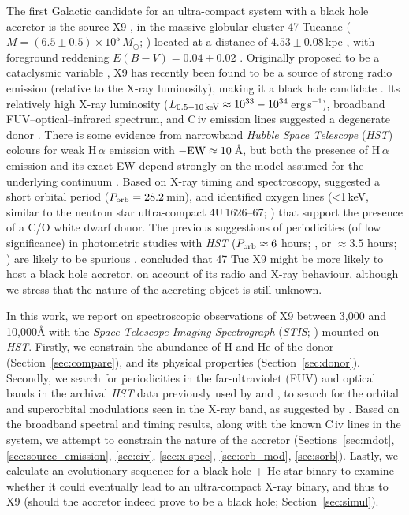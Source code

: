 \documentclass[a4paper,fleqn,usenatbib]{mnras}
\begin{document}
The first Galactic candidate for an ultra-compact system with a black hole accretor is the source X9 \citep{2015MNRAS.453.3918M}, in the massive globular cluster 47 Tucanae ($M = (6.5 \pm 0.5)\times 10^{5}\,M_\odot$; \citealp{2015AJ....149...53K}) located at a distance of $4.53 \pm 0.08$\,kpc \citep{2016ApJ...831..184B}, with foreground reddening $E(B-V) = 0.04 \pm 0.02$ \citep{2007A&A...476..243S}. Originally proposed to be a cataclysmic variable \citep{1992Natur.360...46P, 2001Sci...292.2290G}, X9 has recently been found to be a source of strong radio emission (relative to the X-ray luminosity), making it a black hole candidate \citep{2015MNRAS.453.3918M}. Its relatively high X-ray luminosity ($L_{\rm 0.5-10\,keV} \approx 10^{33} - 10^{34}$\,erg\,s$^{-1}$), broadband FUV--optical--infrared spectrum, and C\,{\sc iv} emission lines \citep{2008ApJ...683.1006K} suggested a degenerate donor \citep{2015MNRAS.453.3918M}. There is some evidence from narrowband {\it Hubble Space Telescope} ({\it HST}) colours for weak H\,$\alpha$ emission with $\rm -EW \approx 10$\,{\AA}, but both the presence of H\,$\alpha$ emission and its exact EW depend strongly on the model assumed for the underlying continuum \citep{2015MNRAS.453.3918M}. Based on X-ray timing and spectroscopy, \citet{2017MNRAS.467.2199B} suggested a short orbital period ($P_{\rm orb}=28.2$\,min), and identified oxygen lines (<1\,keV, similar to the neutron star ultra-compact 4U\,1626--67; \citealp{2007ApJ...660..605K}) that support the presence of a C/O white dwarf donor. The previous suggestions of periodicities (of low significance) in photometric studies with {\it HST} ($P_{\rm orb} \approx 6$ hours; \citealp{1992Natur.360...46P}, or $\approx 3.5$ hours; \citealp{2003ApJ...596.1197E}) are likely to be spurious \citep{2017MNRAS.467.2199B}. \citet{2017MNRAS.467.2199B} concluded that 47 Tuc X9 might be more likely to host a black hole accretor, on account of its radio and X-ray behaviour, although we stress that the nature of the accreting object is still unknown.

In this work, we report on spectroscopic observations of X9 between 3,000 and 10,000{\AA} with the {\it Space Telescope Imaging Spectrograph} ({\it STIS}; \citealp{1998PASP..110.1183W}) mounted on {\it HST}. Firstly, we constrain the abundance of H and He of the donor (Section~\ref{sec:compare}), and its physical properties (Section~\ref{sec:donor}). Secondly, we search for periodicities in the far-ultraviolet (FUV) and optical bands in the archival {\it HST} data previously used by \citet{2002ApJ...579..752K, 2003ApJ...599.1320K, 2008ApJ...683.1006K} and \citet{2003ApJ...596.1177E, 2003ApJ...596.1197E}, to search for the orbital and superorbital modulations seen in the X-ray band, as suggested by \citet{2017MNRAS.467.2199B}. Based on the broadband spectral and timing results, along with the known C\,{\sc iv} lines in the system, we attempt to constrain the nature of the accretor (Sections~\ref{sec:mdot}, \ref{sec:source_emission}, \ref{sec:civ}, \ref{sec:x-spec}, \ref{sec:orb_mod}, \ref{sec:sorb}). Lastly, we calculate an evolutionary sequence for a black hole + He-star binary to examine whether it could eventually lead to an ultra-compact X-ray binary, and thus to X9 (should the accretor indeed prove to be a black hole; Section~\ref{sec:simul}).
\end{document}
